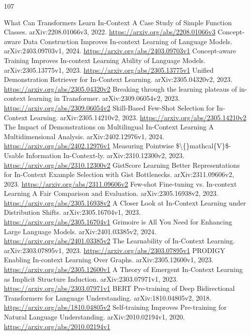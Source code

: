 \documentclass[11pt]{article}
\begin{document}
\begin{thebibliography}{107}
 What Can Transformers Learn In-Context A Case Study of Simple Function Classes. arXiv:2208.01066v3, 2022. \url{https://arxiv.org/abs/2208.01066v3}
 Concept-aware Data Construction Improves In-context Learning of Language Models. arXiv:2403.09703v1, 2024. \url{https://arxiv.org/abs/2403.09703v1}
 Concept-aware Training Improves In-context Learning Ability of Language Models. arXiv:2305.13775v1, 2023. \url{https://arxiv.org/abs/2305.13775v1}
 Unified Demonstration Retriever for In-Context Learning. arXiv:2305.04320v2, 2023. \url{https://arxiv.org/abs/2305.04320v2}
 Breaking through the learning plateaus of in-context learning in Transformer. arXiv:2309.06054v2, 2023. \url{https://arxiv.org/abs/2309.06054v2}
 Skill-Based Few-Shot Selection for In-Context Learning. arXiv:2305.14210v2, 2023. \url{https://arxiv.org/abs/2305.14210v2}
 The Impact of Demonstrations on Multilingual In-Context Learning A Multidimensional Analysis. arXiv:2402.12976v1, 2024. \url{https://arxiv.org/abs/2402.12976v1}
 Measuring Pointwise \$\textbackslash\{\}mathcal\{V\}\$-Usable Information In-Context-ly. arXiv:2310.12300v2, 2023. \url{https://arxiv.org/abs/2310.12300v2}
 GistScore Learning Better Representations for In-Context Example Selection with Gist Bottlenecks. arXiv:2311.09606v2, 2023. \url{https://arxiv.org/abs/2311.09606v2}
 Few-shot Fine-tuning vs. In-context Learning A Fair Comparison and Evaluation. arXiv:2305.16938v2, 2023. \url{https://arxiv.org/abs/2305.16938v2}
 A Closer Look at In-Context Learning under Distribution Shifts. arXiv:2305.16704v1, 2023. \url{https://arxiv.org/abs/2305.16704v1}
 Grimoire is All You Need for Enhancing Large Language Models. arXiv:2401.03385v2, 2024. \url{https://arxiv.org/abs/2401.03385v2}
 The Learnability of In-Context Learning. arXiv:2303.07895v1, 2023. \url{https://arxiv.org/abs/2303.07895v1}
 PRODIGY Enabling In-context Learning Over Graphs. arXiv:2305.12600v1, 2023. \url{https://arxiv.org/abs/2305.12600v1}
 A Theory of Emergent In-Context Learning as Implicit Structure Induction. arXiv:2303.07971v1, 2023. \url{https://arxiv.org/abs/2303.07971v1}
 BERT Pre-training of Deep Bidirectional Transformers for Language Understanding. arXiv:1810.04805v2, 2018. \url{https://arxiv.org/abs/1810.04805v2}
 Self-training Improves Pre-training for Natural Language Understanding. arXiv:2010.02194v1, 2020. \url{https://arxiv.org/abs/2010.02194v1}

\end{thebibliography}
\end{document}
